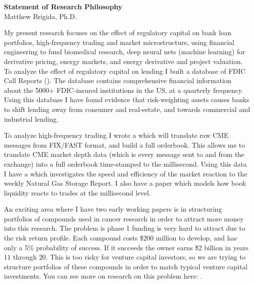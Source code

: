 \documentclass[12pt]{article}
\begin{document}
\vspace*{-3cm}
\begin{center}
{\bf Statement of Research Philosophy}\\
Matthew Brigida, Ph.D.
\end{center}
\vspace*{0.25cm}
My present research focuses on the effect of regulatory capital on bank loan portfolios, high-frequency trading and market microstructure, using financial engineering to fund biomedical research, deep neural nets (machine learning) for derivative pricing, energy markets, and energy derivative and project valuation.  To analyze the effect of regulatory capital on lending I built a database of FDIC Call Reports (\href{https://github.com/Matt-Brigida/FFIEC_Call_Reports}{\color{Blue}{available here}}).  The database contains comprehensive financial information about the 5000+ FDIC-insured institutions in the US, at a quarterly frequency. Using this database I have found evidence that risk-weighting assets causes banks to shift lending away from consumer and real-estate, and towards commercial and industrial lending.

To analyze high-frequency trading I wrote a \href{https://github.com/Matt-Brigida/CME-FIX-FAST-Translator}{\color{Blue}{series of scripts}} which will translate raw CME messages from FIX/FAST format, and build a full orderbook.  This allows me to translate CME market depth data (which is every message sent to and from the exchange) into a full orderbook time-stamped to the millisecond.  Using this data I have a \href{https://papers.ssrn.com/sol3/papers.cfm?abstract_id=2848527}{\color{Blue}{research paper}} which investigates the speed and efficiency of the market reaction to the weekly Natural Gas Storage Report.  I also have a paper which models how book liquidity reacts to trades at the millisecond level.

An exciting area where I have two early working papers is in structuring portfolios of compounds used in cancer research in order to attract more money into this research. The problem is phase 1 funding is very hard to attract due to the risk return profile.  Each compound costs \$200 million to develop, and has only a 5\% probability of success.  If it succeeds the owner earns \$2 billion in years $11$ through $20$.  This is too risky for venture capital investors, so we are trying to structure portfolios of these compounds in order to match typical venture capital investments.  You can see more on research on this problem here: \href{http://cancerx.mit.edu/}{\color{Blue}{http://cancerx.mit.edu/}}.
\end{document}
